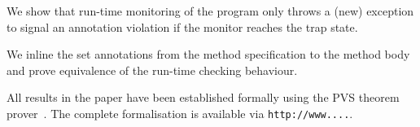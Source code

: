 \begin{inparaenum}
We show that run-time monitoring of the program
only throws a (new) exception to signal an annotation violation if the
monitor reaches the trap state.
\item We inline the \textsf{set} annotations from the method specification
to the method body and prove equivalence of the run-time checking behaviour.
\end{inparaenum}
All results in the paper have been established formally using
the PVS theorem prover~\cite{OwreRRSS96}. The complete formalisation
is available via \texttt{http://www....}.



